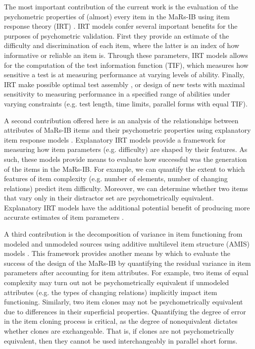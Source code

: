 \documentclass[a4paper,man,natbib]{apa6}
\begin{document}
The most important contribution of the current work is the evaluation of the psychometric properties of (almost) every item in the MaRs-IB using item response theory (IRT) \citep{embretson2013item, de2013theory}. IRT models confer several important benefits for the purposes of psychometric validation. First they provide an estimate of the difficulty and discrimination of each item, where the latter is an index of how informative or reliable an item is. Through these parameters, IRT models allows for the computation of the test information function (TIF), which measures how sensitive a test is at measuring performance at varying levels of ability. Finally, IRT make possible optimal test assembly \citep{van1998optimal}, or design of new tests with maximal sensitivity to measuring performance in a specified range of abilities under varying constraints (e.g. test length, time limits, parallel forms with equal TIF).

A second contribution offered here is an analysis of the relationships between attributes of MaRs-IB items and their psychometric properties using explanatory item response models \citep{de2004explanatory, wilson2008explanatory}. Explanatory IRT models provide a framework for measuring how item parameters (e.g. difficulty) are shaped by their features. As such, these models provide means to evaluate how successful was the generation of the items in the MaRs-IB. For example, we can quantify the extent to which features of item complexity (e.g. number of elements, number of changing relations) predict item difficulty. Moreover, we can determine whether two items that vary only in their distractor set are psychometrically equivalent. Explanatory IRT models have the additional potential benefit of producing more accurate estimates of item parameters \citep{neuhaus2006separating}. 


A third contribution is the decomposition of variance in item functioning from modeled and unmodeled sources using additive multilevel item structure (AMIS) models \citep{geerlings2011modeling, cho2014additive, lathrop2017item}. This framework provides another means by which to evaluate the success of the design of the MaRs-IB by quantifying the residual variance in item parameters after accounting for item attributes. For example, two items of equal complexity may turn out not be psychometrically equivalent if unmodeled attributes (e.g. the types of changing relations) implicitly impact item functioning. Similarly, two item clones may not be psychometrically equivalent due to differences in their superficial properties. Quantifying the degree of error in the item cloning process is critical, as the degree of nonequivalent dictates whether clones are exchangeable. That is, if clones are not psychometrically equivalent, then they cannot be used interchangeably in parallel short forms.  
\end{document}
